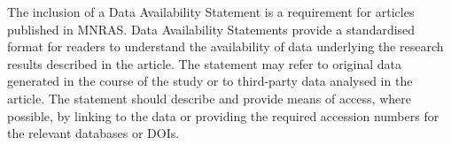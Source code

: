 \documentclass[fleqn,usenatbib]{mnras}
\begin{document}
 
The inclusion of a Data Availability Statement is a requirement for articles published in MNRAS. Data Availability Statements provide a standardised format for readers to understand the availability of data underlying the research results described in the article. The statement may refer to original data generated in the course of the study or to third-party data analysed in the article. The statement should describe and provide means of access, where possible, by linking to the data or providing the required accession numbers for the relevant databases or DOIs.







 





\appendix





\bsp	%
\label{lastpage}
\end{document}
